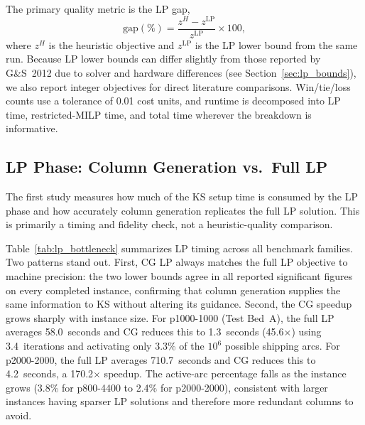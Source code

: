 The primary quality metric is the LP gap,
\[
  \text{gap}(\%) = \frac{z^H - z^{\mathrm{LP}}}{z^{\mathrm{LP}}} \times 100,
\]
where $z^H$ is the heuristic objective and $z^{\mathrm{LP}}$ is the LP lower
bound from the same run.
Because LP lower bounds can differ slightly from those reported by G\&S~2012
due to solver and hardware differences (see Section~\ref{sec:lp_bounds}),
we also report integer objectives for direct literature comparisons.
Win/tie/loss counts use a tolerance of 0.01 cost units, and runtime is
decomposed into LP time, restricted-MILP time, and total time wherever
the breakdown is informative.

\subsection{LP Phase: Column Generation vs.\ Full LP}
\label{sec:study_lp}

The first study measures how much of the KS setup time is consumed by the LP
phase and how accurately column generation replicates the full LP solution.
This is primarily a timing and fidelity check, not a heuristic-quality
comparison.

Table~\ref{tab:lp_bottleneck} summarizes LP timing across all benchmark families.
Two patterns stand out.
First, CG LP always matches the full LP objective to machine precision: the
two lower bounds agree in all reported significant figures on every completed
instance, confirming that column generation supplies the same information to KS
without altering its guidance.
Second, the CG speedup grows sharply with instance size.
For p1000-1000 (Test Bed~A), the full LP averages 58.0~seconds and CG reduces
this to 1.3~seconds (45.6$\times$) using 3.4~iterations and activating only 3.3\%
of the $10^6$ possible shipping arcs.
For p2000-2000, the full LP averages 710.7~seconds and CG reduces this to
4.2~seconds, a 170.2$\times$ speedup.
The active-arc percentage falls as the instance grows (3.8\% for p800-4400 to
2.4\% for p2000-2000), consistent with larger instances having sparser LP
solutions and therefore more redundant columns to avoid.

